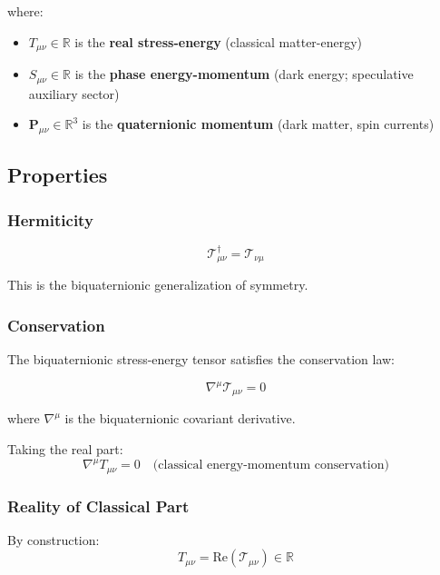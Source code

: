 where:
\begin{itemize}
    \item $T_{\mu\nu} \in \mathbb{R}$ is the \textbf{real stress-energy} (classical matter-energy)
    \item $S_{\mu\nu} \in \mathbb{R}$ is the \textbf{phase energy-momentum} (dark energy; speculative auxiliary sector)
    \item $\mathbf{P}_{\mu\nu} \in \mathbb{R}^3$ is the \textbf{quaternionic momentum} (dark matter, spin currents)
\end{itemize}

\subsection{Properties}

\subsubsection{Hermiticity}

\begin{equation}
\mathcal{T}_{\mu\nu}^\dagger = \mathcal{T}_{\nu\mu}
\end{equation}

This is the biquaternionic generalization of symmetry.

\subsubsection{Conservation}

The biquaternionic stress-energy tensor satisfies the conservation law:

\begin{equation}
\label{eq:canonical:biq_conservation}
\nabla^\mu \mathcal{T}_{\mu\nu} = 0
\end{equation}

where $\nabla^\mu$ is the biquaternionic covariant derivative.

Taking the real part:
\begin{equation}
\nabla^\mu T_{\mu\nu} = 0 \quad \text{(classical energy-momentum conservation)}
\end{equation}

\subsubsection{Reality of Classical Part}

By construction:
\begin{equation}
T_{\mu\nu} = \text{Re}(\mathcal{T}_{\mu\nu}) \in \mathbb{R}
\end{equation}

